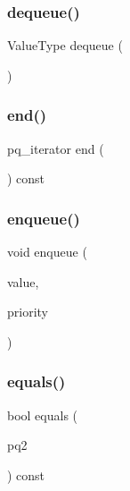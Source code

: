 \mbox{\label{classPriorityQueue_aaee07e371e2370e76e6c42bada727ba2}} 
\subsubsection{\texorpdfstring{dequeue()}{dequeue()}}
{\footnotesize\ttfamily Value\+Type dequeue (\begin{DoxyParamCaption}{ }\end{DoxyParamCaption})}

\mbox{\label{classPriorityQueue_a57bd03708d373db49c5d34a781a4d7cb}} 
\subsubsection{\texorpdfstring{end()}{end()}}
{\footnotesize\ttfamily pq\+\_\+iterator end (\begin{DoxyParamCaption}{ }\end{DoxyParamCaption}) const\hspace{0.3cm}{\ttfamily [inline]}}

\mbox{\label{classPriorityQueue_a25b238c85272091d0662ad153abe058d}} 
\subsubsection{\texorpdfstring{enqueue()}{enqueue()}}
{\footnotesize\ttfamily void enqueue (\begin{DoxyParamCaption}\item[{const Value\+Type \&}]{value,  }\item[{double}]{priority }\end{DoxyParamCaption})}

\mbox{\label{classPriorityQueue_aeb5957e78736d9b9cfed5e600166d5f0}} 
\subsubsection{\texorpdfstring{equals()}{equals()}}
{\footnotesize\ttfamily bool equals (\begin{DoxyParamCaption}\item[{const \mbox{\hyperlink{classPriorityQueue}{Priority\+Queue}}$<$ Value\+Type $>$ \&}]{pq2 }\end{DoxyParamCaption}) const}

